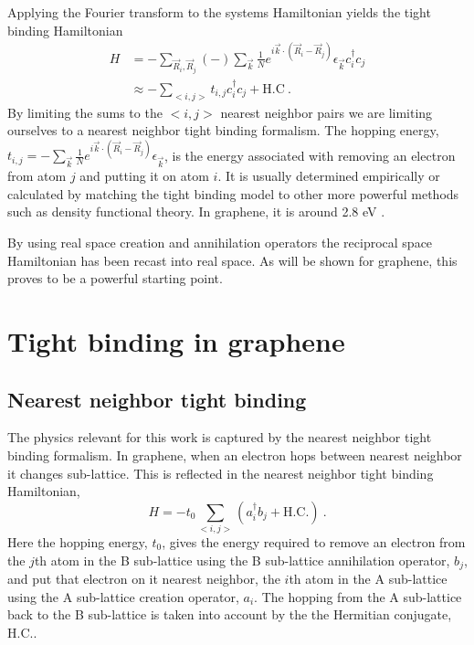 Applying the Fourier transform to the systems Hamiltonian yields the tight binding Hamiltonian
\begin{align*}
	H&=-\sum_{\vec{R}_i, \vec{R}_j} (-) \sum_{\vec{k}}\frac{1}{N} e^{i \vec{k} \cdot (\vec{R}_i-\vec{R}_j)}
	 \epsilon_{\vec{k}} c^{\dagger}_{i} c_{j} \\
	 &\approx -\sum_{<i,j>} t_{i,j} c^{\dagger}_{i} c_{j} + \text{H.C} \ .
\end{align*}
By limiting the sums to the $<i,j>$ nearest neighbor pairs we are limiting ourselves to a nearest neighbor tight binding formalism.
The hopping energy, $t_{i,j}=-\sum_{\vec{k}}\frac{1}{N} e^{i \vec{k} \cdot (\vec{R}_i-\vec{R}_j)}\epsilon_{\vec{k}}$, is the energy associated with removing an electron from atom $j$ and putting it on atom $i$.
It is usually determined empirically or calculated by matching the tight binding model to other more powerful methods such as density functional theory.
In graphene, it is around 2.8 eV \cite{CastroNeto2009}.

By using real space creation and annihilation operators the reciprocal space Hamiltonian has been recast into real space.
As will be shown for graphene, this proves to be a powerful starting point.

\section{Tight binding in graphene}

\subsection{Nearest neighbor tight binding}
The physics relevant for this work is captured by the nearest neighbor tight binding formalism.
In graphene, when an electron hops between nearest neighbor it changes sub-lattice.
This is reflected in the nearest neighbor tight binding Hamiltonian,
\begin{equation}
	H=-t_0 \sum_{<i,j>} (a_i^{\dagger} b_j + \text{H.C.}) \ .
	\label{eq:TB:baseham}
\end{equation}
Here the hopping energy, $t_0$, gives the energy required to remove an electron from the $j$th atom in the B sub-lattice using the B sub-lattice annihilation operator, $b_j$, and put that electron on it nearest neighbor, the $i$th atom in the A sub-lattice using the A sub-lattice creation operator, $a_i$.
The hopping from the A sub-lattice back to the B sub-lattice is taken into account by the the Hermitian conjugate, $\text{H.C.}$.


